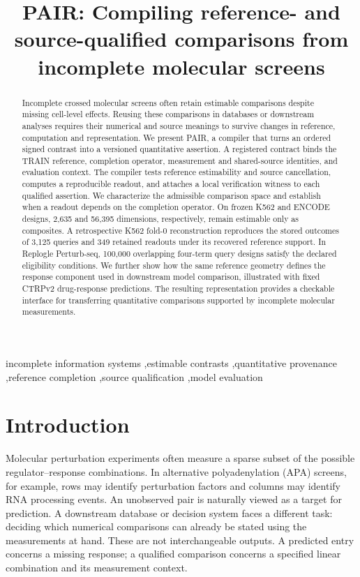 \documentclass[preprint,11pt,times,number,sort&compress]{elsarticle}
\begin{document}
\begin{frontmatter}
\title{PAIR: Compiling reference- and source-qualified comparisons from incomplete molecular screens}

\begin{abstract}
Incomplete crossed molecular screens often retain estimable comparisons despite missing cell-level effects. Reusing these comparisons in databases or downstream analyses requires their numerical and source meanings to survive changes in reference, computation and representation. We present PAIR, a compiler that turns an ordered signed contrast into a versioned quantitative assertion. A registered contract binds the TRAIN reference, completion operator, measurement and shared-source identities, and evaluation context. The compiler tests reference estimability and source cancellation, computes a reproducible readout, and attaches a local verification witness to each qualified assertion. We characterize the admissible comparison space and establish when a readout depends on the completion operator. On frozen K562 and ENCODE designs, 2,635 and 56,395 dimensions, respectively, remain estimable only as composites. A retrospective K562 fold-0 reconstruction reproduces the stored outcomes of 3,125 queries and 349 retained readouts under its recovered reference support. In Replogle Perturb-seq, 100,000 overlapping four-term query designs satisfy the declared eligibility conditions. We further show how the same reference geometry defines the response component used in downstream model comparison, illustrated with fixed CTRPv2 drug-response predictions. The resulting representation provides a checkable interface for transferring quantitative comparisons supported by incomplete molecular measurements.
\end{abstract}
\begin{keyword}
incomplete information systems \sep estimable contrasts \sep quantitative provenance \sep reference completion \sep source qualification \sep model evaluation
\end{keyword}
\end{frontmatter}
\linenumbers

\section{Introduction}\label{sec:intro}
Molecular perturbation experiments often measure a sparse subset of the possible regulator--response combinations. In alternative polyadenylation (APA) screens, for example, rows may identify perturbation factors and columns may identify RNA processing events. An unobserved pair is naturally viewed as a target for prediction. A downstream database or decision system faces a different task: deciding which numerical comparisons can already be stated using the measurements at hand. These are not interchangeable outputs. A predicted entry concerns a missing response; a qualified comparison concerns a specified linear combination and its measurement context.
\end{document}

